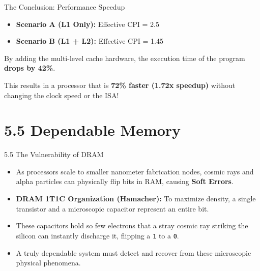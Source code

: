 \documentclass[aspectratio=169]{beamer}
\begin{document}
\begin{frame}{The Conclusion: Performance Speedup}
\begin{itemize}
    \item \textbf{Scenario A (L1 Only):} Effective CPI = 2.5
    \item \textbf{Scenario B (L1 + L2):} Effective CPI = 1.45
\end{itemize}
\vspace{0.5cm}

By adding the multi-level cache hardware, the execution time of the program \textbf{drops by 42\%}.

\vspace{0.5cm}
This results in a processor that is \textbf{72\% faster (1.72x speedup)} without changing the clock speed or the ISA!
\end{frame}

\section{5.5 Dependable Memory}

\begin{frame}{5.5 The Vulnerability of DRAM}
\begin{itemize}
    \item As processors scale to smaller nanometer fabrication nodes, cosmic rays and alpha particles can physically flip bits in RAM, causing \textbf{Soft Errors}.
    \vspace{0.3cm}
    \item \textbf{DRAM 1T1C Organization (Hamacher):} To maximize density, a single transistor and a microscopic capacitor represent an entire bit.
    \vspace{0.3cm}
    \item These capacitors hold so few electrons that a stray cosmic ray striking the silicon can instantly discharge it, flipping a \texttt{1} to a \texttt{0}. 
    \vspace{0.3cm}
    \item A truly dependable system must detect and recover from these microscopic physical phenomena.
\end{itemize}
\end{frame}
\end{document}
